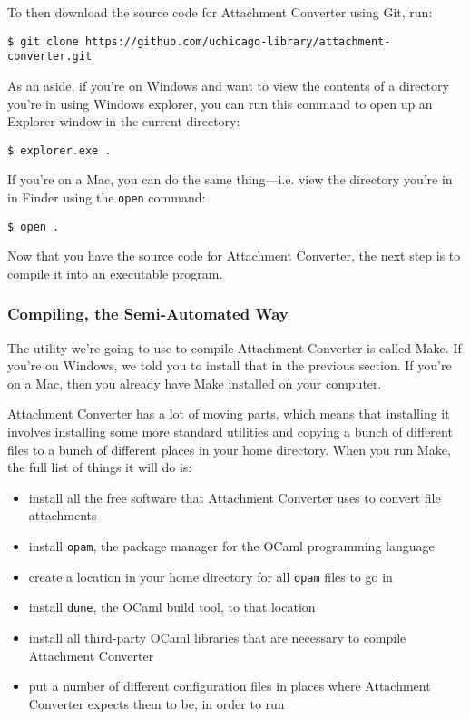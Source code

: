 \documentclass[11pt]{article}
\begin{document}
To then download the source code for Attachment Converter using Git,
run:

\begin{verbatim}
$ git clone https://github.com/uchicago-library/attachment-converter.git
\end{verbatim}

As an aside, if you're on Windows and want to view the contents of a
directory you're in using Windows explorer, you can run this command
to open up an Explorer window in the current directory:

\begin{verbatim}
$ explorer.exe .
\end{verbatim}

If you're on a Mac, you can do the same thing---i.e. view the
directory you're in in Finder using the \texttt{open} command:

\begin{verbatim}
$ open .
\end{verbatim}

Now that you have the source code for Attachment Converter, the next
step is to compile it into an executable program.

\subsubsection{Compiling, the Semi-Automated Way}
\label{sec:org54cca75}

The utility we're going to use to compile Attachment Converter is
called Make.  If you're on Windows, we told you to install that in the
previous section.  If you're on a Mac, then you already have Make
installed on your computer.

Attachment Converter has a lot of moving parts, which means that
installing it involves installing some more standard utilities and
copying a bunch of different files to a bunch of different places in
your home directory.  When you run Make, the full list of things it
will do is:

\begin{itemize}
\item install all the free software that Attachment Converter uses to
convert file attachments
\item install \texttt{opam}, the package manager for the OCaml programming language
\item create a location in your home directory for all \texttt{opam} files to go in
\item install \texttt{dune}, the OCaml build tool, to that location
\item install all third-party OCaml libraries that are necessary to
compile Attachment Converter
\item put a number of different configuration files in places where
Attachment Converter expects them to be, in order to run
\end{itemize}
\end{document}
